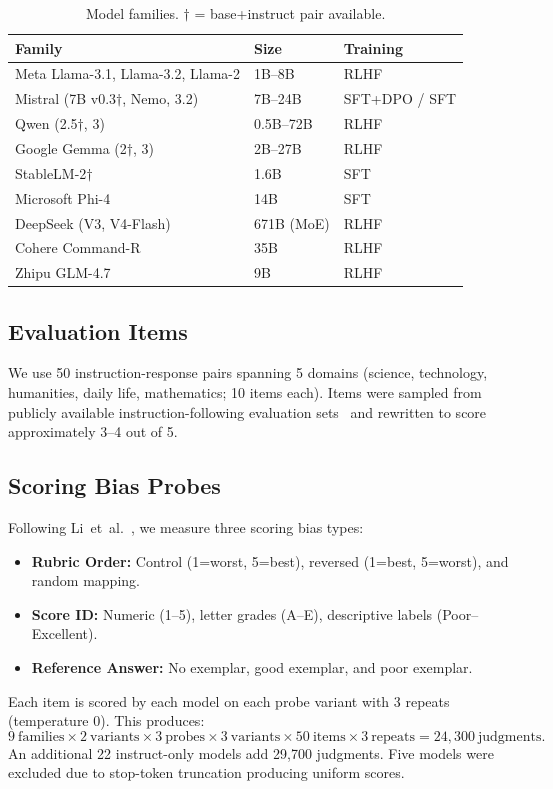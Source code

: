 \documentclass[11pt,a4paper]{article}
\begin{document}
\begin{table}[h]
\centering\small
\caption{Model families. $\dagger$ = base+instruct pair available.}
\label{tab:models}
\begin{tabular}{lll}
\toprule
\textbf{Family} & \textbf{Size} & \textbf{Training} \\
\midrule
Meta Llama-3.1, Llama-3.2, Llama-2 & 1B--8B & RLHF \\
Mistral (7B v0.3$\dagger$, Nemo, 3.2) & 7B--24B & SFT+DPO / SFT \\
Qwen (2.5$\dagger$, 3) & 0.5B--72B & RLHF \\
Google Gemma (2$\dagger$, 3) & 2B--27B & RLHF \\
StableLM-2$\dagger$ & 1.6B & SFT \\
Microsoft Phi-4 & 14B & SFT \\
DeepSeek (V3, V4-Flash) & 671B (MoE) & RLHF \\
Cohere Command-R & 35B & RLHF \\
Zhipu GLM-4.7 & 9B & RLHF \\
\bottomrule
\end{tabular}
\end{table}

\subsection{Evaluation Items}
We use 50 instruction-response pairs spanning 5 domains (science, technology, humanities, daily life, mathematics; 10 items each). Items were sampled from publicly available instruction-following evaluation sets~\cite{alpacaeval,zheng2023judging} and rewritten to score approximately 3--4 out of 5.

\subsection{Scoring Bias Probes}
Following Li~et~al.~\cite{li2025scoring}, we measure three scoring bias types:
\begin{itemize}
    \item \textbf{Rubric Order:} Control (1=worst, 5=best), reversed (1=best, 5=worst), and random mapping.
    \item \textbf{Score ID:} Numeric (1--5), letter grades (A--E), descriptive labels (Poor--Excellent).
    \item \textbf{Reference Answer:} No exemplar, good exemplar, and poor exemplar.
\end{itemize}
Each item is scored by each model on each probe variant with 3 repeats (temperature 0). This produces:
\[
9~\text{families} \times 2~\text{variants} \times 3~\text{probes} \times 3~\text{variants} \times 50~\text{items} \times 3~\text{repeats} = 24,300~\text{judgments}.
\]
An additional 22 instruct-only models add 29,700 judgments. Five models were excluded due to stop-token truncation producing uniform scores.
\end{document}
